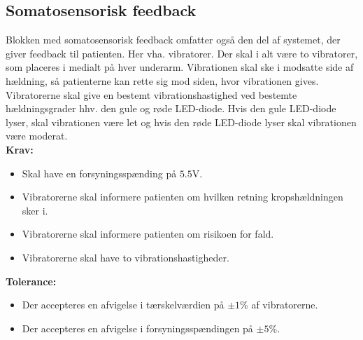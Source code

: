 \subsection{Somatosensorisk feedback} 
Blokken med somatosensorisk feedback omfatter også den del af systemet, der giver feedback til patienten. Her vha. vibratorer. Der skal i alt være to vibratorer, som placeres i medialt på hver underarm. Vibrationen skal ske i modsatte side af hældning, så patienterne kan rette sig mod siden, hvor vibrationen gives. Vibratorerne skal give en bestemt vibrationshastighed ved bestemte hældningsgrader hhv. den gule og røde LED-diode. Hvis den gule LED-diode lyser, skal vibrationen være let og hvis den røde LED-diode lyser skal vibrationen være moderat.
\\
\textbf{Krav:}
\begin{itemize}
	\item Skal have en forsyningsspænding på $5.5$V.
	\item Vibratorerne skal informere patienten om hvilken retning kropshældningen sker i.
	\item Vibratorerne skal informere patienten om risikoen for fald.
	\item Vibratorerne skal have to vibrationshastigheder.
\end{itemize}
\textbf{Tolerance:}
\begin{itemize}
	\item Der accepteres en afvigelse i tærskelværdien på $\pm1\%$ af vibratorerne.
	\item Der accepteres en afvigelse i forsyningsspændingen på $\pm5\%$.
\end{itemize}

